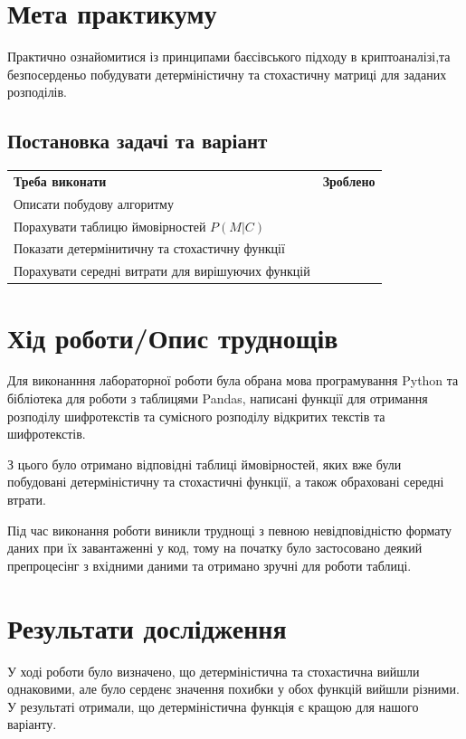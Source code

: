 \section{Мета практикуму}

Практично ознайомитися із принципами баєсівського підходу в криптоаналізі,та безпосерденьо побудувати детерміністичну та стохастичну матриці для заданих розподілів. 


\subsection{Постановка задачі та варіант}
\begin{tabularx}{\textwidth}{X|X}
	\textbf{Треба виконати} & \textbf{Зроблено} \\
	Описати побудову алгоритму & \checkmark \\
	Порахувати таблицю ймовірностей $P(\textit{M}|\textit{C})$ & \checkmark \\
	Показати детермінитичну та стохастичну функції & \checkmark \\
	Порахувати середні витрати для вирішуючих функцій & \checkmark \\
\end{tabularx}



\section{Хід роботи/Опис труднощів}
    Для виконанння лабораторної роботи була обрана мова програмування Python та бібліотека для роботи з таблицями Pandas, написані функції для отримання розподілу шифротекстів та сумісного розподілу відкритих текстів та шифротекстів. 
    
    З цього було отримано відповідні таблиці ймовірностей, яких вже були побудовані детерміністичну та стохастичні функції, а також обраховані середні втрати. 
    
    Під час виконання роботи виникли труднощі з певною невідповідністю формату даних при їх завантаженні у код, тому на початку було застосовано деякий препроцесінг з вхідними даними та отримано зручні для роботи таблиці.


\section{Результати дослідження}
У ході роботи було визначено, що детерміністична та стохастична вийшли однаковими, але було серденє значення похибки у обох функцій вийшли різними. У результаті отримали, що  детерміністична функція є кращою для нашого варіанту.

